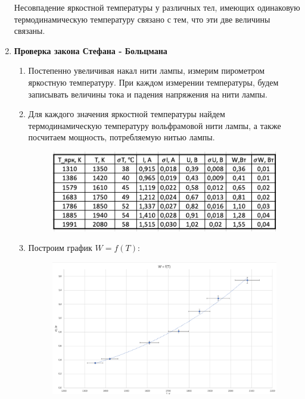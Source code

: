\documentclass[a4paper, 12pt]{article}%
\begin{document}
\begin{enumerate}
Несовпадение яркостной температуры у различных тел,  имеющих одинаковую термодинамическую температуру связано с тем, что эти две величины связаны.

\item \textbf{Проверка закона Стефана - Больцмана}

\begin{enumerate}

\item Постепенно увеличивая накал нити лампы,  измерим пирометром яркостную температуру.  При каждом измерении температуры,  будем записывать величины тока и падения напряжения на нити лампы.

\item Для каждого значения яркостной температуры найдем термодинамическую температуру вольфрамовой нити лампы,  а также посчитаем мощность,  потребляемую нитью лампы.

\begin{figure}[ht]
    \centering
    \includegraphics[width=10cm]{Таблица3.PNG}
\end{figure}

\item Построим график $W = f(T)$:

\begin{figure}[ht]
    \centering
    \includegraphics[width=12cm]{График2.PNG}
\end{figure}

\newpage


\end{enumerate}
\end{enumerate}
\end{document}
